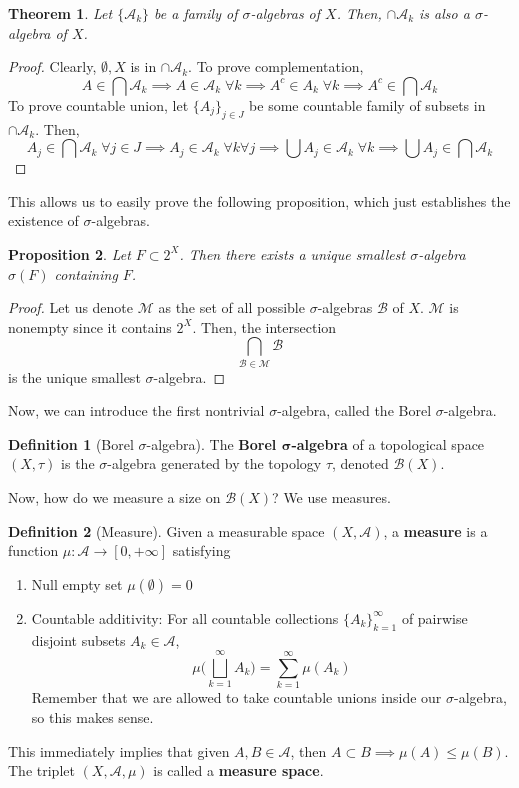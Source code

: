 \documentclass{article}
\newtheorem{theorem}{Theorem}[section]
\newtheorem{proposition}[theorem]{Proposition}
\theoremstyle{remark}
\theoremstyle{definition}
\newtheorem{definition}{Definition}[section]
\begin{document}
\begin{theorem}
Let $\{\mathcal{A}_k\}$ be a family of $\sigma$-algebras of $X$. Then, $\cap \mathcal{A}_k$ is also a $\sigma$-algebra of $X$. 
\end{theorem}
\begin{proof}
Clearly, $\emptyset, X$ is in $\cap \mathcal{A}_k$. To prove complementation, 
\[A \in \bigcap \mathcal{A}_k \implies A \in \mathcal{A}_k \; \forall k \implies A^c \in A_k \; \forall k \implies A^c \in \bigcap \mathcal{A}_k\] 
To prove countable union, let $\{A_j\}_{j \in J}$ be some countable family of subsets in $\cap \mathcal{A}_k$. Then, 
\[A_j \in \bigcap \mathcal{A}_k \; \forall j \in J \implies A_j \in \mathcal{A}_k \; \forall k \forall j \implies \bigcup A_j \in \mathcal{A}_k \; \forall k \implies \bigcup A_j \in \bigcap \mathcal{A}_k\]
\end{proof}

This allows us to easily prove the following proposition, which just establishes the existence of $\sigma$-algebras. 

\begin{proposition}
Let $F \subset 2^X$. Then there exists a unique smallest $\sigma$-algebra $\sigma(F)$ containing $F$. 
\end{proposition}
\begin{proof}
Let us denote $\mathcal{M}$ as the set of all possible $\sigma$-algebras $\mathcal{B}$ of $X$. $\mathcal{M}$ is nonempty since it contains $2^X$. Then, the intersection 
\[\bigcap_{\mathcal{B} \in \mathcal{M}} \mathcal{B}\]
is the unique smallest $\sigma$-algebra. 
\end{proof}

Now, we can introduce the first nontrivial $\sigma$-algebra, called the Borel $\sigma$-algebra. 

\begin{definition}[Borel $\sigma$-algebra]
The \textbf{Borel $\boldsymbol{\sigma}$-algebra} of a topological space $(X, \tau)$ is the $\sigma$-algebra generated by the topology $\tau$, denoted $\mathcal{B}(X)$. 
\end{definition}

Now, how do we measure a size on $\mathcal{B}(X)$? We use measures. 

\begin{definition}[Measure]
Given a measurable space $(X, \mathcal{A})$, a \textbf{measure} is a function $\mu : \mathcal{A} \longrightarrow [0, +\infty]$ satisfying 
\begin{enumerate}
    \item Null empty set $\mu(\emptyset) = 0$ 
    \item Countable additivity: For all countable collections $\{A_k\}_{k=1}^\infty$ of pairwise disjoint subsets $A_k \in \mathcal{A}$, 
    \[\mu \bigg( \bigsqcup_{k=1}^\infty A_k \bigg) = \sum_{k=1}^\infty \mu(A_k)\]
    Remember that we are allowed to take countable unions inside our $\sigma$-algebra, so this makes sense. 
\end{enumerate}
This immediately implies that given $A, B \in \mathcal{A}$, then $A \subset B \implies \mu(A) \leq \mu(B)$. The triplet $(X, \mathcal{A}, \mu)$ is called a \textbf{measure space}. 
\end{definition}
\end{document}
